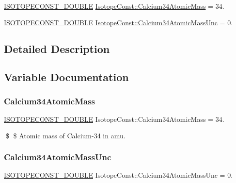 \begin{DoxyCompactItemize}
\item 
\mbox{\hyperlink{group___isotope_const-_macros_ga8f45a7272ce02c0b4c65c44636ed719a}{I\+S\+O\+T\+O\+P\+E\+C\+O\+N\+S\+T\+\_\+\+D\+O\+U\+B\+LE}} \mbox{\hyperlink{group___isotope_const-_calcium-_ca34_ga127dcf85d5d6a1f68e335eddd8c165a1}{Isotope\+Const\+::\+Calcium34\+Atomic\+Mass}} = 34.
\item 
\mbox{\hyperlink{group___isotope_const-_macros_ga8f45a7272ce02c0b4c65c44636ed719a}{I\+S\+O\+T\+O\+P\+E\+C\+O\+N\+S\+T\+\_\+\+D\+O\+U\+B\+LE}} \mbox{\hyperlink{group___isotope_const-_calcium-_ca34_ga9a63062f02da25e2536e5a8221dfe6b5}{Isotope\+Const\+::\+Calcium34\+Atomic\+Mass\+Unc}} = 0.
\end{DoxyCompactItemize}


\subsection{Detailed Description}


\subsection{Variable Documentation}
\mbox{\label{group___isotope_const-_calcium-_ca34_ga127dcf85d5d6a1f68e335eddd8c165a1}} 
\subsubsection{\texorpdfstring{Calcium34\+Atomic\+Mass}{Calcium34AtomicMass}}
{\footnotesize\ttfamily \mbox{\hyperlink{group___isotope_const-_macros_ga8f45a7272ce02c0b4c65c44636ed719a}{I\+S\+O\+T\+O\+P\+E\+C\+O\+N\+S\+T\+\_\+\+D\+O\+U\+B\+LE}} Isotope\+Const\+::\+Calcium34\+Atomic\+Mass = 34.}

\$ \$ Atomic mass of Calcium-\/34 in amu. \mbox{\label{group___isotope_const-_calcium-_ca34_ga9a63062f02da25e2536e5a8221dfe6b5}} 
\subsubsection{\texorpdfstring{Calcium34\+Atomic\+Mass\+Unc}{Calcium34AtomicMassUnc}}
{\footnotesize\ttfamily \mbox{\hyperlink{group___isotope_const-_macros_ga8f45a7272ce02c0b4c65c44636ed719a}{I\+S\+O\+T\+O\+P\+E\+C\+O\+N\+S\+T\+\_\+\+D\+O\+U\+B\+LE}} Isotope\+Const\+::\+Calcium34\+Atomic\+Mass\+Unc = 0.}

